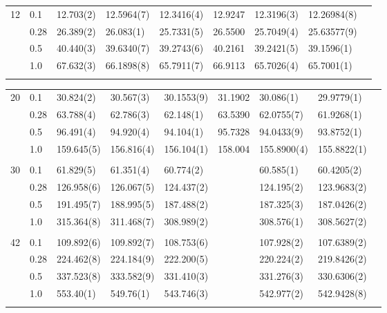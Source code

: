 {\begin{landscape}
\begin{table}
\begin{tabularx}{\hsize}{llR{2.65cm}R{2.65cm}R{2.65cm}R{2.65cm}R{2.65cm}R{2.65cm}R{2.65cm}}
				12 & 0.1 & 12.703(2) & 12.5964(7) & 12.3416(4) & 12.9247 & 12.3196(3) & 12.26984(8) \\ 
				& 0.28 & 26.389(2) & 26.083(1) & 25.7331(5) & 26.5500 & 25.7049(4) & 25.63577(9) \\
				& 0.5 & 40.440(3) & 39.6340(7) & 39.2743(6) & 40.2161 & 39.2421(5) & 39.1596(1) \\
				& 1.0 & 67.632(3) & 66.1898(8) & 65.7911(7) & 66.9113 & 65.7026(4) & 65.7001(1) \\ \hdashline
			\end{tabularx}
		\end{table}
		
		\begin{table}
			\begin{tabularx}{\hsize}{llR{2.65cm}R{2.65cm}R{2.65cm}R{2.65cm}R{2.65cm}R{2.65cm}R{2.65cm}} \\
				\label{tab:quantumdotswinteraction2D2}
				20 & 0.1 & 30.824(2) & 30.567(3) & 30.1553(9) & 31.1902 & 30.086(1) & 29.9779(1) \\ 
				& 0.28 & 63.788(4) & 62.786(3) & 62.148(1) & 63.5390 & 62.0755(7) & 61.9268(1) \\
				& 0.5 & 96.491(4) & 94.920(4) & 94.104(1) & 95.7328 & 94.0433(9) & 93.8752(1) \\
				& 1.0 & 159.645(5) & 156.816(4) & 156.104(1) & 158.004 & 155.8900(4) & 155.8822(1) & \phantom{=} \\ \hdashline \\
				
				30 & 0.1 & 61.829(5) & 61.351(4) & 60.774(2) & & 60.585(1) & 60.4205(2) \\ 
				& 0.28 & 126.958(6) & 126.067(5) & 124.437(2) & & 124.195(2) & 123.9683(2) \\
				& 0.5 & 191.495(7) & 188.995(5) & 187.488(2) & & 187.325(3) & 187.0426(2) \\
				& 1.0 & 315.364(8) & 311.468(7) & 308.989(2) & & 308.576(1) & 308.5627(2) \\ \hdashline \\
				
				42 & 0.1 & 109.892(6) & 109.892(7) & 108.753(6) & &  107.928(2) & 107.6389(2) \\ 
				& 0.28 & 224.462(8) & 224.184(9) & 222.200(5) & & 220.224(2) & 219.8426(2) \\
				& 0.5 & 337.523(8) & 333.582(9) & 331.410(3) & & 331.276(3) & 330.6306(2) \\
				& 1.0 & 553.40(1) & 549.76(1) & 543.746(3) & & 542.977(2) & 542.9428(8) \\ \hdashline \\
				

\end{tabularx}
\end{table}
\end{landscape}}
